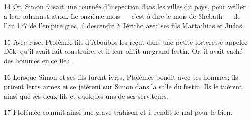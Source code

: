 14 Or, Simon faisait une tournée d’inspection dans les villes du pays, pour veiller à leur administration. Le onzième mois --- c’est-à-dire le mois de Shebath --- de l’an 177 de l’empire grec, il descendit à Jéricho avec ses fils Mattathias et Judas.

15 Avec ruse, Ptolémée fils d’Aboubos les reçut dans une petite forteresse appelée Dôk, qu’il avait fait construire, et il leur offrit un grand festin. Or, il avait caché des hommes en ce lieu.

16 Lorsque Simon et ses fils furent ivres, Ptolémée bondit avec ses hommes; ils prirent leurs armes et se jetèrent sur Simon dans la salle du festin. Ils le tuèrent, ainsi que ses deux fils et quelques-uns de ses serviteurs.

17 Ptolémée commit ainsi une grave trahison et il rendit le mal pour le bien.
